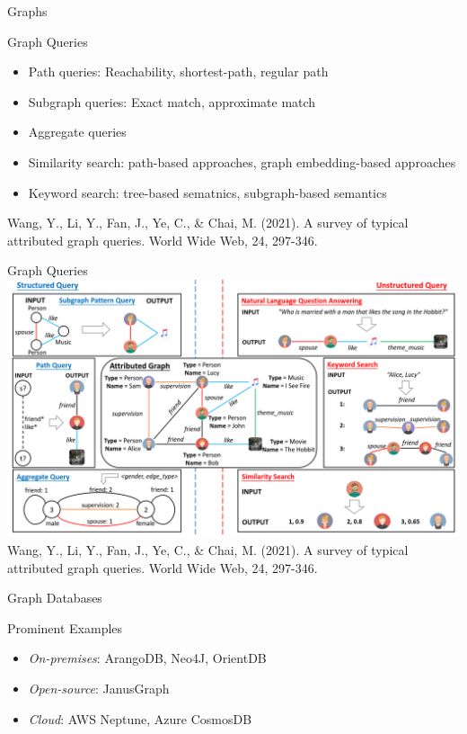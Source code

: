 \documentclass[ignorenonframetext,xcolor=x11names]{beamer}
\begin{document}
\begin{frame}{Graphs}
\begin{block}{Graph Queries}
\begin{itemize}
	\item Path queries: Reachability, shortest-path, regular path
	\item Subgraph queries: Exact match, approximate match
	\item Aggregate queries
	\item Similarity search: path-based approaches, graph embedding-based approaches
	\item Keyword search: tree-based sematnics, subgraph-based semantics
\end{itemize}
\end{block}
\scriptsize
Wang, Y., Li, Y., Fan, J., Ye, C., \& Chai, M. (2021). A survey of typical attributed graph queries. World Wide Web, 24, 297-346.
\end{frame}

\begin{frame}{Graph Queries}
\includegraphics[width=\textwidth]{screen3.png}
\scriptsize
Wang, Y., Li, Y., Fan, J., Ye, C., \& Chai, M. (2021). A survey of typical attributed graph queries. World Wide Web, 24, 297-346.
\end{frame}

\begin{frame}{Graph Databases}
\begin{block}{Prominent Examples}
\begin{itemize}
	\item \emph{On-premises}: ArangoDB, Neo4J, OrientDB
	\item \emph{Open-source}: JanusGraph
	\item \emph{Cloud}: AWS Neptune, Azure CosmosDB
\end{itemize}
\end{block}
\end{frame}
\end{document}

